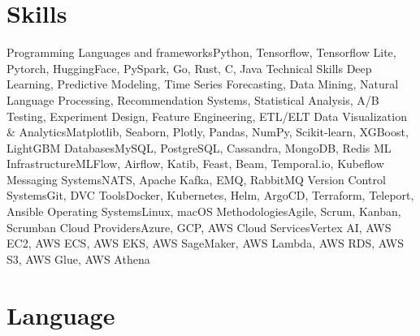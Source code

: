 \section{Skills}

\cvline%
{Programming Languages and frameworks}{Python, Tensorflow, Tensorflow Lite, Pytorch, HuggingFace, PySpark, Go, Rust, C, Java}
\cvline%
{Technical Skills} {Deep Learning, Predictive Modeling, Time Series Forecasting, Data Mining, Natural Language Processing, Recommendation Systems, Statistical Analysis, A/B Testing, Experiment Design, Feature Engineering, ETL/ELT}
\cvline%
{Data Visualization \& Analytics}{Matplotlib, Seaborn, Plotly, Pandas, NumPy, Scikit-learn, XGBoost, LightGBM}
\cvline%
{Databases}{MySQL, PostgreSQL, Cassandra, MongoDB, Redis}
\cvline%
{ML Infrastructure}{MLFlow, Airflow, Katib, Feast, Beam, Temporal.io, Kubeflow}
\cvline%
{Messaging Systems}{NATS, Apache Kafka, EMQ, RabbitMQ}
\cvline%
{Version Control Systems}{Git, DVC}
\cvline%
{Tools}{Docker, Kubernetes, Helm, ArgoCD, Terraform, Teleport, Ansible}
\cvline%
{Operating Systems}{Linux, macOS}
\cvline%
{Methodologies}{Agile, Scrum, Kanban, Scrumban}
\cvline%
{Cloud Providers}{Azure, GCP, AWS}
\cvline%
{Cloud Services}{Vertex AI, AWS EC2, AWS ECS, AWS EKS, AWS SageMaker, AWS Lambda, AWS RDS, AWS S3, AWS Glue, AWS Athena}

\section{Language}


\emptysection{}\closesection{}

